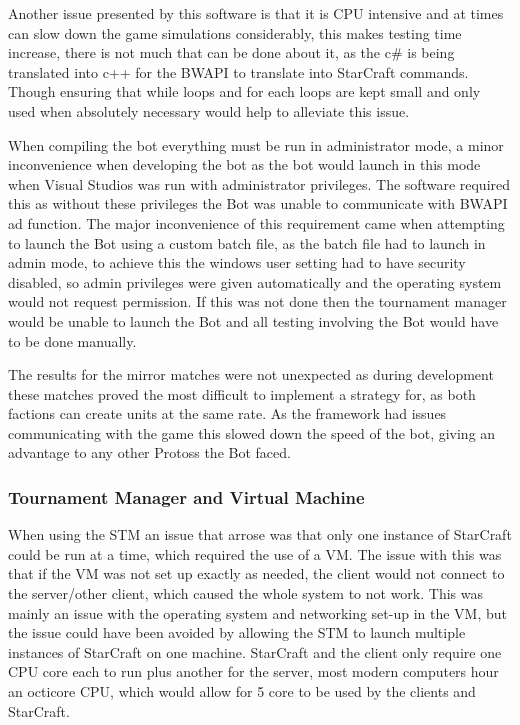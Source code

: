 \documentclass[journal]{IEEEtran}
\begin{document}
	Another issue presented by this software is that it is CPU intensive and at times can slow down the game simulations considerably, this makes testing time increase, there is not much that can be done about it, as the c\# is being translated into c++ for the BWAPI to translate into StarCraft commands. Though ensuring that while loops and for each loops are kept small and only used when absolutely necessary would help to alleviate this issue.
	
	When compiling the bot everything must be run in administrator mode, a minor inconvenience when developing the bot as the bot would launch in this mode when Visual Studios was run with administrator privileges. The software required this as without these privileges the Bot was unable to communicate with BWAPI ad function. The major inconvenience of this requirement came when attempting to launch the Bot using a custom batch file, as the batch file had to launch in admin mode, to achieve this the windows user setting had to have security disabled, so admin privileges were given automatically and the operating system would not request permission. If this was not done then the tournament manager would be unable to launch the Bot and all testing involving the Bot would have to be done manually.
	
	The results for the mirror matches were not unexpected as during development these matches proved the most difficult to implement a strategy for, as both factions can create units at the same rate. As the framework had issues communicating with the game this slowed down the speed of the bot, giving an advantage to any other Protoss the Bot faced. 
	\newline
	\subsubsection{Tournament Manager and Virtual Machine}
	When using the STM an issue that arrose was that only one instance of StarCraft could be run at a time, which required the use of a VM. The issue with this was that if the VM was not set up exactly as needed, the client would not connect to the server/other client, which caused the whole system to not work. This was mainly an issue with the operating system and networking set-up in the VM, but the issue could have been avoided by allowing the STM to launch multiple instances of StarCraft on one machine. StarCraft and the client only require one CPU core each to run plus another for the server, most modern computers hour an octicore CPU, which would allow for 5 core to be used by the clients and StarCraft. 
	
\end{document}
